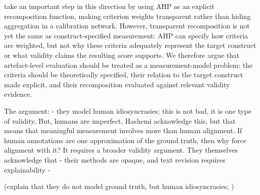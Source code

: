 \citet{bang_transforming_2025} take an important step in this direction by using AHP as an explicit recomposition function, making criterion weights transparent rather than hiding aggregation in a calibration network. However, transparent recomposition is not yet the same as construct-specified measurement: AHP can specify how criteria are weighted, but not why these criteria adequately represent the target construct or what validity claims the resulting score supports. We therefore argue that artefact-level evaluation should be treated as a measurement-model problem: the criteria should be theoretically specified, their relation to the target construct made explicit, and their recomposition evaluated against relevant validity evidence.






The argument:
- they model human idiosyncrasies; this is not bad, it is one type of validity. But, humans are imperfect, Hashemi acknowledge this, but that means that meaningful measurement involves more than human alignment. If human annotations are one approximation of the ground truth, then why force alignment with it? It requires a broader validity argument. They themselves acknowledge that 
- their methods are opaque, and text revision requires explainability
- 

(explain that they do not model ground truth, but human idiosyncrasies; )







